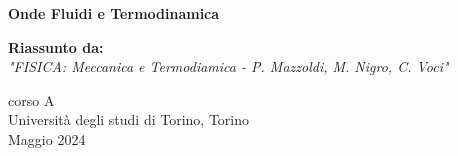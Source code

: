 \begin{titlepage}
	\begin{center}
		\vspace*{1cm}
		\begin{center}
		\end{center}
		\vspace{1.5cm}
		\textbf{\LARGE Onde Fluidi e Termodinamica}
		
		\vspace{0.5cm}
		\textbf{Riassunto da:} \\
		
		\textit{"FISICA: Meccanica e Termodiamica - P. Mazzoldi, M. Nigro, C. Voci"} \\
	
		
		
		\vfill
		
		
		
		\vspace{0.8cm}
		
		
		
		corso A\\
		Università degli studi di Torino, Torino\\
		Maggio 2024\\
		
		
	\end{center}
\end{titlepage}
